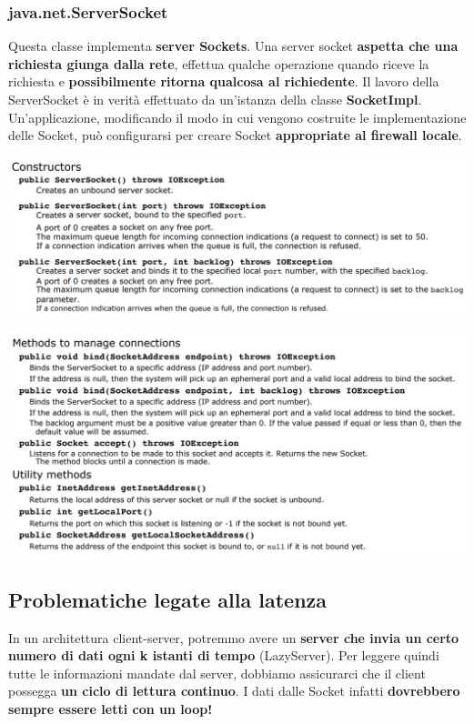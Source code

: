 \documentclass[12pt]{article}
\begin{document}
\subsubsection{java.net.ServerSocket}
Questa classe implementa \textbf{server Sockets}. Una server socket \textbf{aspetta che una richiesta giunga dalla rete}, effettua qualche operazione quando riceve la richiesta e \textbf{possibilmente ritorna qualcosa al richiedente}. Il lavoro della ServerSocket è in verità effettuato da un'istanza della classe \textbf{SocketImpl}. Un'applicazione, modificando il modo in cui vengono costruite le implementazione delle Socket, può configurarsi per creare Socket \textbf{appropriate al firewall locale}.
\begin{center}
    \includegraphics[width = 1.15\textwidth]{Images/33.PNG}
\end{center}
\begin{center}
    \includegraphics[width = 1.15\textwidth]{Images/34.PNG}
\end{center}
\subsection{Problematiche legate alla latenza}
In un architettura client-server, potremmo avere un \textbf{server che invia un certo numero di dati ogni k istanti di tempo} (LazyServer). Per leggere quindi tutte le informazioni mandate dal server, dobbiamo assicurarci che il client possegga \textbf{un ciclo di lettura continuo}. I dati dalle Socket infatti \textbf{dovrebbero sempre essere letti con un loop!}
\end{document}
